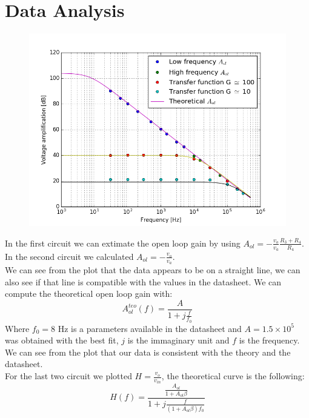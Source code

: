 \section{Data Analysis}
\begin{figure}[H]
\centering
\includegraphics[width=.7\textwidth]{4/decibel.png}
\end{figure}
In the first circuit we can extimate the open loop gain by using $A_{ol} = - \frac{v_{o}}{v_a} \frac{R_3 + R_4}{R_4}$.
In the second circuit we calculated $A_{ol} = - \frac{v_{o}}{v_a}$. \\
We can see from the plot that the data appears to be on a straight line, we can also see if that line is compatible with the values in the datasheet. We can compute the theoretical open loop gain with: $$A_{ol}^{teo}(f) = \frac{A}{1 + j\frac{f}{f_0}}$$ Where $f_0 = 8$ Hz is a parameters available in the datasheet and  $A = 1.5 \times 10^5$ was obtained with the best fit, $j$ is the immaginary unit and $f$ is the frequency. We can see from the plot that our data is consistent with the theory and the datasheet.\\
For the last two circuit we plotted $H = \frac{v_{o}}{v_{in}}$, the theoretical curve is the following:
\[H(f) = \frac{\frac{A_{ol} }{1 + A_{ol} \beta}}{1 + j \frac{f}{(1 + A_{ol} \beta)f_0}}\]